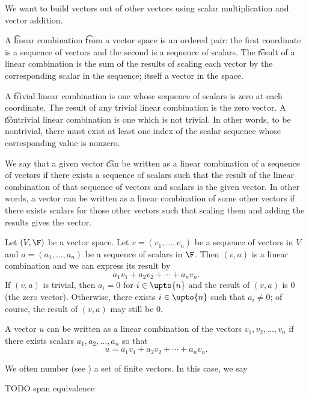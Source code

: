 

We want to build vectors out of other vectors using scalar multiplication and vector addition.


A \t{linear combination} \t{from} a vector space is an ordered pair: the first coordinate is a sequence of vectors and the second is a sequence of scalars.
The \t{result} of a linear combination is the sum of the results of scaling each vector by the corresponding scalar in the sequence; itself a vector in the space.

A \t{trivial linear combination} is one whose sequence of scalars is zero at each coordinate.
The result of any trivial linear combination is the zero vector.
A \t{nontrivial linear combination} is one which is not trivial.
In other words, to be nontrivial, there must exist at least one index of the scalar sequence whose corresponding value is nonzero.

We say that a given vector \t{can be written as a linear combination of} a sequence of vectors if there exists a sequence of scalars such that the result of the linear combination of that sequence of vectors and scalars is the given vector.
In other words, a vector can be written as a linear combination of some other vectors if there exists scalars for those other vectors such that scaling them and adding the results gives the vector.


Let $(V, \F)$ be a vector space.
Let $v = (v_1, \dots, v_n)$ be a sequence of vectors in $V$ and
$a = (a_1, \dots, a_n)$ be a sequence of scalars in $\F$.
Then $(v, a)$ is a linear combination and we can express its result by
$$
  a_1v_1 + a_2v_2 + \cdots + a_n v_n.
$$
If $(v,a)$ is trivial, then $a_i = 0$ for $i \in \upto{n}$ and the result of $(v, a)$ is $0$ (the zero vector).
Otherwise, there exists $i \in \upto{n}$ such that $a_i \neq 0$; of course, the result of $(v, a)$ may still be $0$.

A vector $u$ can be written as a linear combination of the vectors $v_1, v_2, \dots, v_n$ if there exists scalars $a_1, a_2, \dots, a_n$ so that
\[
  u = a_1v_1 + a_2v_2 + \cdots + a_nv_n.
\]

We often number (see ) a set of finite vectors.
In this case, we say 


TODO span equivalence

